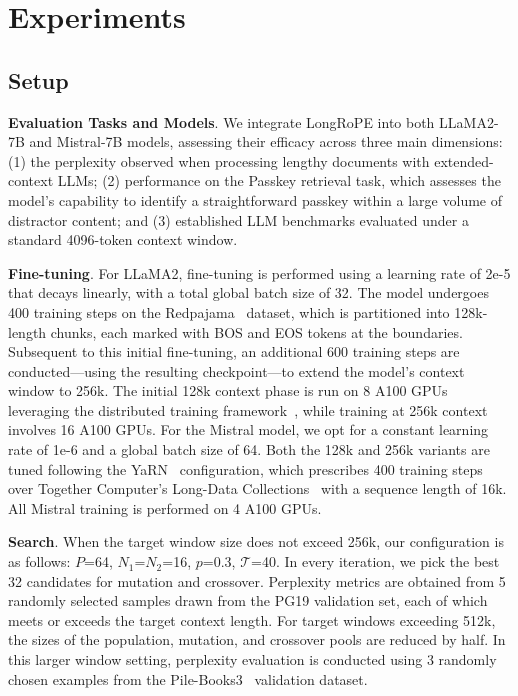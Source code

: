  \section{Experiments}

\label{sec:exp}
\subsection{Setup}
\textbf{Evaluation Tasks and Models}. We integrate LongRoPE into both LLaMA2-7B and Mistral-7B models, assessing their efficacy across three main dimensions: (1) the perplexity observed when processing lengthy documents with extended-context LLMs; (2) performance on the Passkey retrieval task, which assesses the model’s capability to identify a straightforward passkey within a large volume of distractor content; and (3) established LLM benchmarks evaluated under a standard 4096-token context window.

\textbf{Fine-tuning}. For LLaMA2, fine-tuning is performed using a learning rate of 2e-5 that decays linearly, with a total global batch size of 32. The model undergoes 400 training steps on the Redpajama~\cite{redpajama} dataset, which is partitioned into 128k-length chunks, each marked with BOS and EOS tokens at the boundaries. Subsequent to this initial fine-tuning, an additional 600 training steps are conducted—using the resulting checkpoint—to extend the model's context window to 256k. The initial 128k context phase is run on 8 A100 GPUs leveraging the distributed training framework~\cite{cube}, while training at 256k context involves 16 A100 GPUs. For the Mistral model, we opt for a constant learning rate of 1e-6 and a global batch size of 64. Both the 128k and 256k variants are tuned following the YaRN~\cite{yarn} configuration, which prescribes 400 training steps over Together Computer's Long-Data Collections~\cite{mistraldata} with a sequence length of 16k. All Mistral training is performed on 4 A100 GPUs.

\textbf{Search}. When the target window size does not exceed 256k, our configuration is as follows: $P$=64, $N_1$=$N_2$=16, $p$=0.3, $\mathcal{T}$=40. In every iteration, we pick the best 32 candidates for mutation and crossover. Perplexity metrics are obtained from 5 randomly selected samples drawn from the PG19 validation set, each of which meets or exceeds the target context length. For target windows exceeding 512k, the sizes of the population, mutation, and crossover pools are reduced by half. In this larger window setting, perplexity evaluation is conducted using 3 randomly chosen examples from the Pile-Books3~\cite{pile} validation dataset.

